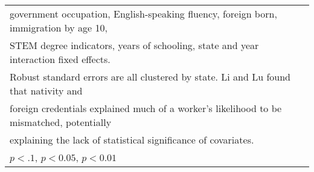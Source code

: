 \begin{table}[htbp]
\begin{tabular}{l*{3}{c}}
\multicolumn{4}{l}{\footnotesize government occupation, English-speaking fluency, foreign born, immigration by age 10,}\\
\multicolumn{4}{l}{\footnotesize STEM degree indicators, years of schooling, state and year interaction fixed effects.}\\
\multicolumn{4}{l}{\footnotesize Robust standard errors are all clustered by state. Li and Lu found that nativity and}\\
\multicolumn{4}{l}{\footnotesize foreign credentials explained much of a worker's likelihood to be mismatched, potentially}\\
\multicolumn{4}{l}{\footnotesize explaining the lack of statistical significance of covariates.}\\
\multicolumn{4}{l}{\footnotesize \sym{*} \(p<.1\), \sym{**} \(p<0.05\), \sym{***} \(p<0.01\)}\\
\end{tabular}
\end{table}
